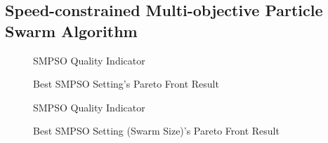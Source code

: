 \documentclass[10pt,journal,compsoc]{IEEEtran}
\begin{document}
\subsection{Speed-constrained Multi-objective Particle Swarm Algorithm}\label{smpso}





\begin{figure}[!t]
\centering
{}
\caption{SMPSO Quality Indicator} 
\end{figure}
\begin{figure}[!t]
\caption{Best SMPSO Setting's Pareto Front Result} 
\end{figure}

\begin{figure}[!t]
\centering
{}
\caption{SMPSO Quality Indicator} 
\end{figure}
\begin{figure}[!t]
\centering
{}
\caption{Best SMPSO Setting (Swarm Size)'s Pareto Front Result} 
\end{figure}
\end{document}
